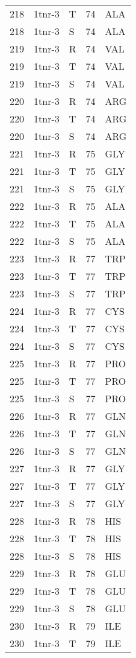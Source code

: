 \begin{tiny}
\begin{longtable}[l]{l|l|l|l|l}
	218 & 1tnr-3 & T & 74 & ALA \\
	218 & 1tnr-3 & S & 74 & ALA \\
	219 & 1tnr-3 & R & 74 & VAL \\
	219 & 1tnr-3 & T & 74 & VAL \\
	219 & 1tnr-3 & S & 74 & VAL \\
	220 & 1tnr-3 & R & 74 & ARG \\
	220 & 1tnr-3 & T & 74 & ARG \\
	220 & 1tnr-3 & S & 74 & ARG \\
	221 & 1tnr-3 & R & 75 & GLY \\
	221 & 1tnr-3 & T & 75 & GLY \\
	221 & 1tnr-3 & S & 75 & GLY \\
	222 & 1tnr-3 & R & 75 & ALA \\
	222 & 1tnr-3 & T & 75 & ALA \\
	222 & 1tnr-3 & S & 75 & ALA \\
	223 & 1tnr-3 & R & 77 & TRP \\
	223 & 1tnr-3 & T & 77 & TRP \\
	223 & 1tnr-3 & S & 77 & TRP \\
	224 & 1tnr-3 & R & 77 & CYS \\
	224 & 1tnr-3 & T & 77 & CYS \\
	224 & 1tnr-3 & S & 77 & CYS \\
	225 & 1tnr-3 & R & 77 & PRO \\
	225 & 1tnr-3 & T & 77 & PRO \\
	225 & 1tnr-3 & S & 77 & PRO \\
	226 & 1tnr-3 & R & 77 & GLN \\
	226 & 1tnr-3 & T & 77 & GLN \\
	226 & 1tnr-3 & S & 77 & GLN \\
	227 & 1tnr-3 & R & 77 & GLY \\
	227 & 1tnr-3 & T & 77 & GLY \\
	227 & 1tnr-3 & S & 77 & GLY \\
	228 & 1tnr-3 & R & 78 & HIS \\
	228 & 1tnr-3 & T & 78 & HIS \\
	228 & 1tnr-3 & S & 78 & HIS \\
	229 & 1tnr-3 & R & 78 & GLU \\
	229 & 1tnr-3 & T & 78 & GLU \\
	229 & 1tnr-3 & S & 78 & GLU \\
	230 & 1tnr-3 & R & 79 & ILE \\
	230 & 1tnr-3 & T & 79 & ILE \\

\end{longtable}
\end{tiny}
